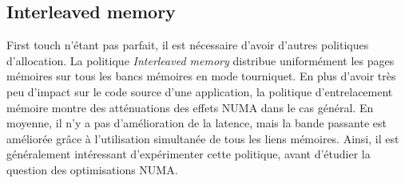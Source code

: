 \subsection{Interleaved memory}
First touch n'étant pas parfait, il est nécessaire d'avoir d'autres politiques d'allocation.
%
La politique {\em Interleaved memory} distribue uniformément les pages mémoires sur tous les bancs mémoires en mode tourniquet.
%
En plus d'avoir très peu d'impact sur le code source d'une application, la politique d'entrelacement mémoire montre des atténuations des effets NUMA dans le cas général.
%
En moyenne, il n'y a pas d'amélioration de la latence, mais la bande passante est améliorée grâce à l'utilisation simultanée de tous les liens mémoires.
%
Ainsi, il est généralement intéressant d'expérimenter cette politique, avant d'étudier la question des optimisations NUMA.
